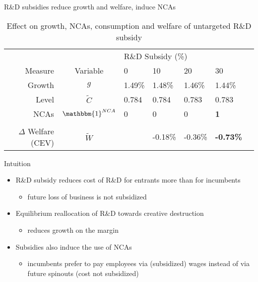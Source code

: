 \documentclass[english,usenames,dvipsnames]{beamer}
\begin{document}
\begin{frame}{R\&D subsidies reduce growth and welfare, induce NCAs}\label{RDsubsidy_table}
		\begin{table}
			\centering
			\small
			\caption*{Effect on growth, NCAs, consumption and welfare of untargeted R\&D subsidy}
			\begin{tabular}{rclllll}
				\toprule \toprule
				 &  & \multicolumn{4}{l}{R\&D Subsidy (\%)} \vspace{3pt} \tabularnewline
				Measure &Variable & 0 & 10 & 20 & 30 \tabularnewline
				\midrule
				Growth & $g$ & 1.49\% & 1.48\% & 1.46\% & 1.44\% \tabularnewline
				Level & $\tilde{C}$  & 0.784 &  0.784 & 0.783 & 0.783 \tabularnewline 
				NCAs & $\mathbbm{1}^{NCA}$ & 0 & 0 & 0 & \alert{\textbf{1}} \tabularnewline
				\tabularnewline
				$\Delta$ Welfare (CEV) & $\tilde{W}$  &  & -0.18\% & -0.36\% & \alert{\textbf{-0.73\%}} \tabularnewline
				\bottomrule
			\end{tabular}
		\end{table}
		\hyperlink{rd_subsidies:decomposition_growth_decrease}{}
		\hyperlink{plots:rd_subsidies1}{}
		\hyperlink{plots:rd_subsidies2}{}
\end{frame}

\begin{frame}{Intuition}
	\begin{itemize}
		\item <+-> R\&D subsidy reduces cost of R\&D for entrants more than for incumbents
		\begin{itemize}
			\item future loss of business is not subsidized
		\end{itemize}
		\medskip
		\item <+-> Equilibrium reallocation of R\&D towards creative destruction
		\begin{itemize}
			\item reduces growth on the margin
		\end{itemize}
		\medskip
		\item <+-> Subsidies also induce the use of NCAs
		\begin{itemize} 
			\item incumbents prefer to pay employees via (subsidized) wages instead of via future spinouts (cost not subsidized)
		\end{itemize}
	\end{itemize}
\end{frame}
\end{document}

